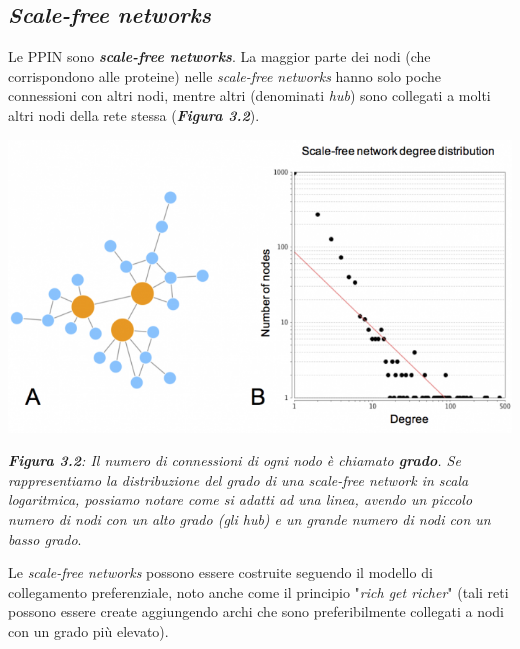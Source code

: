 \documentclass[11pt]{article}
\begin{document}
\subsection{\textit{Scale-free networks}}
Le PPIN sono \textit{\textbf{scale-free networks}}. La maggior parte dei nodi (che corrispondono alle proteine) nelle \textit{scale-free networks} hanno solo poche connessioni con altri nodi, mentre altri (denominati \textit{hub}) sono collegati a molti altri nodi della rete stessa (\textit{\textbf{Figura 3.2}}).

\begin{center}
\includegraphics[scale=0.53]{graffo}

\begin{small}\textit{\textbf{Figura 3.2}: Il numero di connessioni di ogni nodo è chiamato \textbf{grado}. Se rappresentiamo la distribuzione del grado di una \textit{scale-free network} in scala logaritmica, possiamo notare come si adatti ad una linea, avendo un piccolo numero di nodi con un alto grado (gli hub) e un grande numero di nodi con un basso grado}.\end{small}
\end{center}

Le \textit{scale-free networks} possono essere costruite seguendo il modello di collegamento preferenziale, noto anche come il principio "\textit{rich get richer}" (tali reti possono essere create aggiungendo archi che sono preferibilmente collegati a nodi con un grado più elevato).
\end{document}
